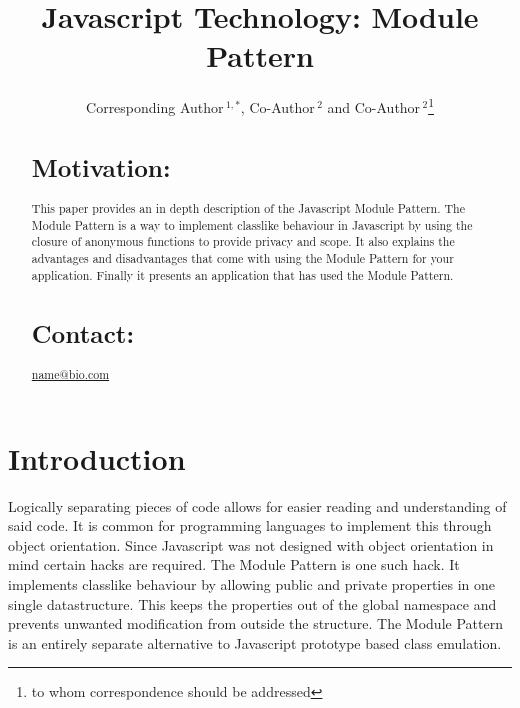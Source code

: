 \documentclass{bioinfo}
\begin{document}
\raggedright
{}

\title[short Title]{Javascript Technology: Module Pattern}
\author[Sample \textit{et~al}]{Corresponding Author\,$^{1,*}$, Co-Author\,$^{2}$ and Co-Author\,$^2$\footnote{to whom correspondence should be addressed}}
\address{$^{1}$Department of XXXXXXX, Address XXXX etc.\\
$^{2}$Department of XXXXXXXX, Address XXXX etc.}



\maketitle

\begin{abstract}

\section{Motivation:}
This paper provides an in depth description of the Javascript Module Pattern. The Module Pattern is a way to implement classlike behaviour in Javascript by using the closure of anonymous functions to provide privacy and scope. It also explains the advantages and disadvantages that come with using the Module Pattern for your application. Finally it presents an application that has used the Module Pattern.

\section{Contact:} \href{name@bio.com}{name@bio.com}
\end{abstract}

\section{Introduction}
Logically separating pieces of code allows for easier reading and understanding of said code. It is common for programming languages to implement this through object orientation.
\vspace{\baselineskip}
Since Javascript was not designed with object orientation in mind certain hacks are required. The Module Pattern is one such hack. It implements classlike behaviour by allowing public and private properties in one single datastructure. This keeps the properties out of the global namespace and prevents unwanted modification from outside the structure. The Module Pattern is an entirely separate alternative to Javascript prototype based class emulation.
\end{document}
